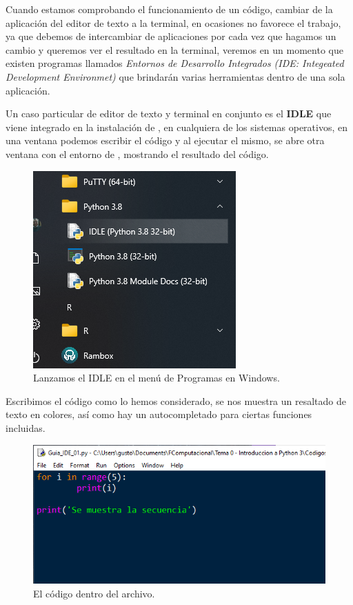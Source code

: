 Cuando estamos comprobando el funcionamiento de un código, cambiar de la aplicación del editor de texto a la terminal, en ocasiones no favorece el trabajo, ya que debemos de intercambiar de aplicaciones por cada vez que hagamos un cambio y queremos ver el resultado en la terminal, veremos en un momento que existen programas llamados \textit{Entornos de Desarrollo Integrados (IDE: Integeated Development Environmet)} que brindarán varias herramientas dentro de una sola aplicación.
\par
Un caso particular de editor de texto y terminal en conjunto es el \textbf{IDLE} que viene integrado en la instalación de \python, en cualquiera de los sistemas operativos, en una ventana podemos escribir el código y al ejecutar el mismo, se abre otra ventana con el entorno de \python, mostrando el resultado del código.
\begin{figure}[H]
    \centering
    \includegraphics[scale=0.7]{Imagenes/Guia_IDE_06.png}
    \caption{Lanzamos el IDLE en el menú de Programas en Windows.}
\end{figure}
Escribimos el código como lo hemos considerado, se nos muestra un resaltado de texto en colores, así como hay un autocompletado para ciertas funciones incluidas.
\begin{figure}[H]
    \centering
    \includegraphics[scale=0.7]{Imagenes/Guia_IDE_07.png}
    \caption{El código dentro del archivo.}
\end{figure}
